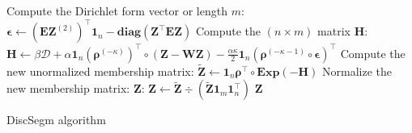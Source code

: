 \documentclass[11p]{article}
\begin{document}
\begin{algorithm}[H]
{		Compute the Dirichlet form vector or length $m$: $\bm{\epsilon} \leftarrow (\mathbf{E}\mathbf{Z}^{(2)})^\top \mathbf{1}_n - \mathbf{diag}(\mathbf{Z}^\top \mathbf{E} \mathbf{Z})$\;
		Compute the $(n \times m)$ matrix $\mathbf{H}$: $\mathbf{H} \leftarrow \beta \bm{\mathcal{D}} + \alpha \mathbf{1}_n (\bm{\rho}^{(-\kappa)})^\top \circ (\mathbf{Z} - \mathbf{W}\mathbf{Z}) - \frac{\alpha \kappa}{2} \mathbf{1}_n (\bm{\rho}^{(-\kappa-1)} \circ \bm{\epsilon})^\top$\;
		Compute the new unormalized membership matrix: $\widetilde{\mathbf{Z}} \leftarrow \mathbf{1}_n \bm{\rho}^\top \circ \mathbf{Exp}(\mathbf{-H})$\;
		Normalize the new membership matrix: $\mathbf{Z}$: $\mathbf{Z} \leftarrow \widetilde{\mathbf{Z}} \div (\widetilde{\mathbf{Z}} \mathbf{1}_m \mathbf{1}_n^\top)$\; 
	}
	\Return $\mathbf{Z}$\;
	\caption{DiscSegm algorithm}
\end{algorithm}
\end{document}
